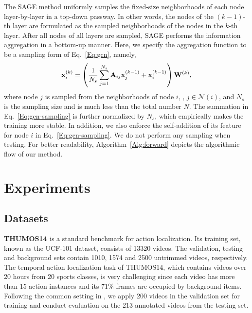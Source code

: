 \documentclass[10pt,journal,compsoc]{IEEEtran}
\begin{document}
	The SAGE method uniformly samples the fixed-size neighborhoods of each node layer-by-layer in a top-down passway. In other words, the nodes of the $(k-1)$-th layer are formulated as the sampled neighborhoods of the nodes in the $k$-th layer. After all nodes of all layers are sampled, SAGE performs the information aggregation in a bottom-up manner. Here, we specify the aggregation function to be a sampling form of Eq.~\eqref{Eq:gcn}, namely,
	\begin{equation} 
	\label{Eq:gcn-sampling}
	{\bf x}_i^{(k)} = \left(\frac{1}{N_s} \sum_{j=1}^{N_s} {\bf A}_{ij}{\bf x}_j^{(k-1)} + {\bf x}_i^{(k-1)}\right){\bf W}^{(k)},
	\end{equation}
	where node $j$ is sampled from the neighborhoods of node $i$, \ie, $j\in\mathcal{N}(i)$, and $N_s$ is the sampling size and is much less than the total number $N$. The summation in Eq.~\eqref{Eq:gcn-sampling} is further normalized by $N_s$, which empirically makes the training more stable. In addition, we also enforce the self-addition of its feature for node $i$ in Eq.~\eqref{Eq:gcn-sampling}.
	We do not perform any sampling when testing. For better readability, Algorithm~\ref{Alg:forward} depicts the algorithmic flow of our method.
	
	
	
	
	
	
	\section{Experiments}\label{Sec:exp}
	
	\subsection{Datasets}
	\textbf{THUMOS14 \cite{jiang2014thumos}} is a standard benchmark for action localization. 
	Its training set, known as the UCF-101 dataset, consists of 13320 videos. The validation, testing and background sets contain 1010, 1574 and 2500 untrimmed videos, respectively. 
	The temporal action localization task of THUMOS14, which contains videos over 20 hours from 20 sports classes, is very challenging
	since each video has more than 15 action instances and its 71\% frames are occupied by background items.
	Following the common setting in \cite{jiang2014thumos}, we apply 200 videos in the validation set for training and conduct evaluation on the 213 annotated videos from the testing set. 
	
\end{document}
